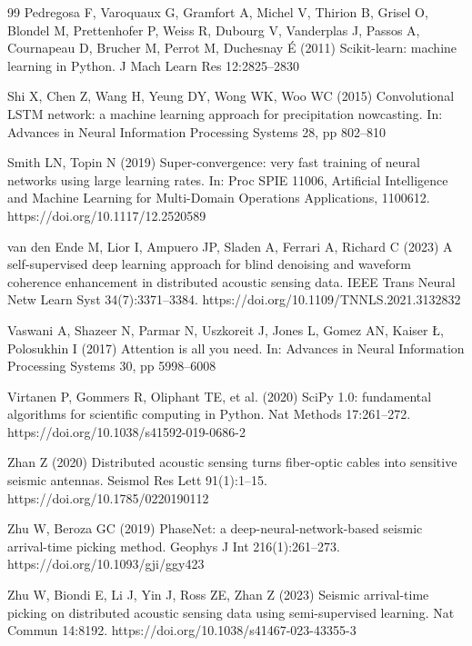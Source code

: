 \begin{thebibliography}{99}
Pedregosa F, Varoquaux G, Gramfort A, Michel V, Thirion B, Grisel O, Blondel M, Prettenhofer P, Weiss R, Dubourg V, Vanderplas J, Passos A, Cournapeau D, Brucher M, Perrot M, Duchesnay \'E (2011) Scikit-learn: machine learning in Python. J Mach Learn Res 12:2825--2830

Shi X, Chen Z, Wang H, Yeung DY, Wong WK, Woo WC (2015) Convolutional LSTM network: a machine learning approach for precipitation nowcasting. In: Advances in Neural Information Processing Systems 28, pp 802--810

Smith LN, Topin N (2019) Super-convergence: very fast training of neural networks using large learning rates. In: Proc SPIE 11006, Artificial Intelligence and Machine Learning for Multi-Domain Operations Applications, 1100612. https://doi.org/10.1117/12.2520589

van den Ende M, Lior I, Ampuero JP, Sladen A, Ferrari A, Richard C (2023) A self-supervised deep learning approach for blind denoising and waveform coherence enhancement in distributed acoustic sensing data. IEEE Trans Neural Netw Learn Syst 34(7):3371--3384. https://doi.org/10.1109/TNNLS.2021.3132832

Vaswani A, Shazeer N, Parmar N, Uszkoreit J, Jones L, Gomez AN, Kaiser {\L}, Polosukhin I (2017) Attention is all you need. In: Advances in Neural Information Processing Systems 30, pp 5998--6008

Virtanen P, Gommers R, Oliphant TE, et al. (2020) SciPy 1.0: fundamental algorithms for scientific computing in Python. Nat Methods 17:261--272. https://doi.org/10.1038/s41592-019-0686-2

Zhan Z (2020) Distributed acoustic sensing turns fiber-optic cables into sensitive seismic antennas. Seismol Res Lett 91(1):1--15. https://doi.org/10.1785/0220190112

Zhu W, Beroza GC (2019) PhaseNet: a deep-neural-network-based seismic arrival-time picking method. Geophys J Int 216(1):261--273. https://doi.org/10.1093/gji/ggy423

Zhu W, Biondi E, Li J, Yin J, Ross ZE, Zhan Z (2023) Seismic arrival-time picking on distributed acoustic sensing data using semi-supervised learning. Nat Commun 14:8192. https://doi.org/10.1038/s41467-023-43355-3
\end{thebibliography}

